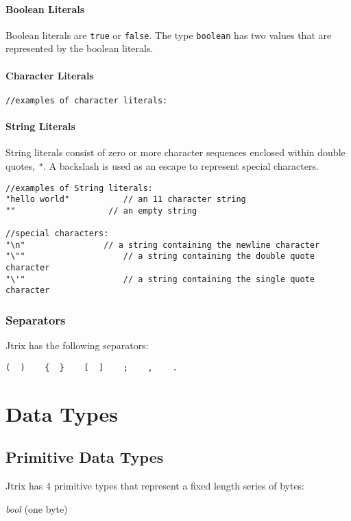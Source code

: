 \documentclass[12pt]{report}
\begin{document}
{\subsubsection{Boolean Literals}
Boolean literals are \texttt{true} or \texttt{false}. The type \texttt{boolean} has two values that are represented by the boolean literals.

\subsubsection{Character Literals}
\begin{lstlisting}
//examples of character literals:

\end{lstlisting}
\subsubsection{String Literals}
String literals consist of zero or more character sequences enclosed within double quotes, \texttt{"}.  A backslash is used as an escape to represent special characters.
\begin{lstlisting}
//examples of String literals:
"hello world"			// an 11 character string
""                   // an empty string

//special characters:
"\n"  				// a string containing the newline character
"\""					// a string containing the double quote character
"\'"					// a string containing the single quote character
\end{lstlisting}
\subsection{Separators}
Jtrix has the following separators:

\begin{lstlisting}
(  )    {  }    [  ]    ;    ,    .
\end{lstlisting}

\chapter{Data Types}

\section{Primitive Data Types}
Jtrix has 4 primitive types that represent a fixed length series of bytes:

\textit{bool}  (one byte)

}
\end{document}
